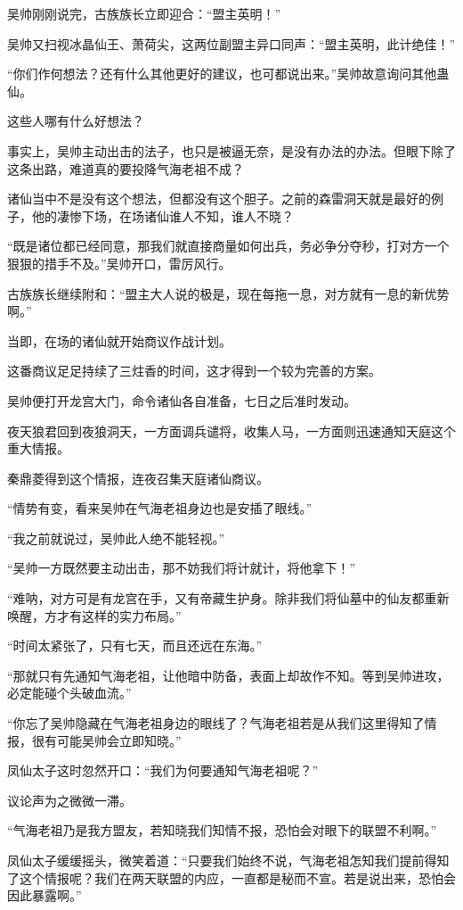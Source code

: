\begin{this_body}
吴帅刚刚说完，古族族长立即迎合：“盟主英明！”

吴帅又扫视冰晶仙王、萧荷尖，这两位副盟主异口同声：“盟主英明，此计绝佳！”

“你们作何想法？还有什么其他更好的建议，也可都说出来。”吴帅故意询问其他蛊仙。

这些人哪有什么好想法？

事实上，吴帅主动出击的法子，也只是被逼无奈，是没有办法的办法。但眼下除了这条出路，难道真的要投降气海老祖不成？

诸仙当中不是没有这个想法，但都没有这个胆子。之前的森雷洞天就是最好的例子，他的凄惨下场，在场诸仙谁人不知，谁人不晓？

“既是诸位都已经同意，那我们就直接商量如何出兵，务必争分夺秒，打对方一个狠狠的措手不及。”吴帅开口，雷厉风行。

古族族长继续附和：“盟主大人说的极是，现在每拖一息，对方就有一息的新优势啊。”

当即，在场的诸仙就开始商议作战计划。

这番商议足足持续了三炷香的时间，这才得到一个较为完善的方案。

吴帅便打开龙宫大门，命令诸仙各自准备，七日之后准时发动。

夜天狼君回到夜狼洞天，一方面调兵谴将，收集人马，一方面则迅速通知天庭这个重大情报。

秦鼎菱得到这个情报，连夜召集天庭诸仙商议。

“情势有变，看来吴帅在气海老祖身边也是安插了眼线。”

“我之前就说过，吴帅此人绝不能轻视。”

“吴帅一方既然要主动出击，那不妨我们将计就计，将他拿下！”

“难呐，对方可是有龙宫在手，又有帝藏生护身。除非我们将仙墓中的仙友都重新唤醒，方才有这样的实力布局。”

“时间太紧张了，只有七天，而且还远在东海。”

“那就只有先通知气海老祖，让他暗中防备，表面上却故作不知。等到吴帅进攻，必定能碰个头破血流。”

“你忘了吴帅隐藏在气海老祖身边的眼线了？气海老祖若是从我们这里得知了情报，很有可能吴帅会立即知晓。”

凤仙太子这时忽然开口：“我们为何要通知气海老祖呢？”

议论声为之微微一滞。

“气海老祖乃是我方盟友，若知晓我们知情不报，恐怕会对眼下的联盟不利啊。”

凤仙太子缓缓摇头，微笑着道：“只要我们始终不说，气海老祖怎知我们提前得知了这个情报呢？我们在两天联盟的内应，一直都是秘而不宣。若是说出来，恐怕会因此暴露啊。”


\end{this_body}
